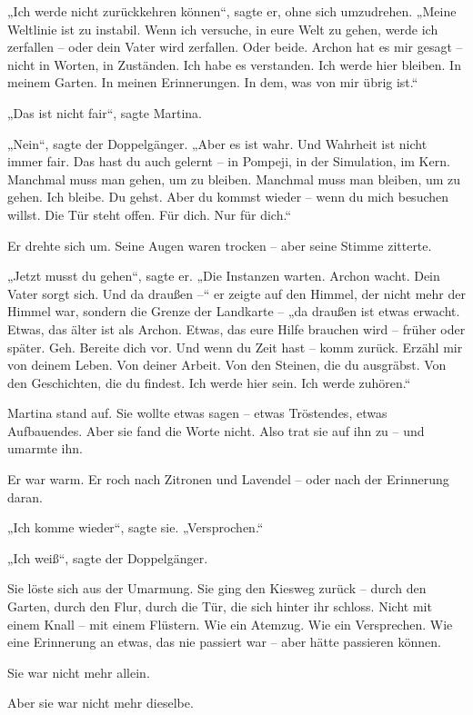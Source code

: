 \documentclass[
]{article}
\begin{document}
„Ich werde nicht zurückkehren können``, sagte er, ohne sich umzudrehen. „Meine Weltlinie ist zu instabil. Wenn ich versuche, in eure Welt zu gehen, werde ich zerfallen -- oder dein Vater wird zerfallen. Oder beide. Archon hat es mir gesagt -- nicht in Worten, in Zuständen. Ich habe es verstanden. Ich werde hier bleiben. In meinem Garten. In meinen Erinnerungen. In dem, was von mir übrig ist.``

„Das ist nicht fair``, sagte Martina.

„Nein``, sagte der Doppelgänger. „Aber es ist wahr. Und Wahrheit ist nicht immer fair. Das hast du auch gelernt -- in Pompeji, in der Simulation, im Kern. Manchmal muss man gehen, um zu bleiben. Manchmal muss man bleiben, um zu gehen. Ich bleibe. Du gehst. Aber du kommst wieder -- wenn du mich besuchen willst. Die Tür steht offen. Für dich. Nur für dich.``

Er drehte sich um. Seine Augen waren trocken -- aber seine Stimme zitterte.

„Jetzt musst du gehen``, sagte er. „Die Instanzen warten. Archon wacht. Dein Vater sorgt sich. Und da draußen --`` er zeigte auf den Himmel, der nicht mehr der Himmel war, sondern die Grenze der Landkarte -- „da draußen ist etwas erwacht. Etwas, das älter ist als Archon. Etwas, das eure Hilfe brauchen wird -- früher oder später. Geh. Bereite dich vor. Und wenn du Zeit hast -- komm zurück. Erzähl mir von deinem Leben. Von deiner Arbeit. Von den Steinen, die du ausgräbst. Von den Geschichten, die du findest. Ich werde hier sein. Ich werde zuhören.``

Martina stand auf. Sie wollte etwas sagen -- etwas Tröstendes, etwas Aufbauendes. Aber sie fand die Worte nicht. Also trat sie auf ihn zu -- und umarmte ihn.

Er war warm. Er roch nach Zitronen und Lavendel -- oder nach der Erinnerung daran.

„Ich komme wieder``, sagte sie. „Versprochen.``

„Ich weiß``, sagte der Doppelgänger.

Sie löste sich aus der Umarmung. Sie ging den Kiesweg zurück -- durch den Garten, durch den Flur, durch die Tür, die sich hinter ihr schloss. Nicht mit einem Knall -- mit einem Flüstern. Wie ein Atemzug. Wie ein Versprechen. Wie eine Erinnerung an etwas, das nie passiert war -- aber hätte passieren können.

Sie war nicht mehr allein.

Aber sie war nicht mehr dieselbe.
\end{document}
